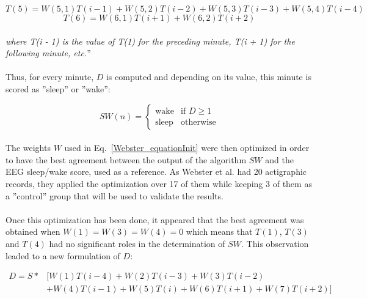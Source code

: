 \documentclass[a4paper,12pt]{article}
\begin{document}
\begin{equation}
T(5) = W(5, 1) T(i - 1) + W(5,2) T(i - 2) + W(5, 3) T(i - 3) + W(5, 4) T(i - 4)
\end{equation}
\begin{equation}
T(6) = W(6, 1) T(i + 1) + W(6, 2) T(i + 2)
\end{equation}

\paragraph{}
\textit{where T(i - 1) is the value of T(1) for the preceding minute, T(i + 1) for the following minute, etc.}''\cite{Webster1982}

\paragraph{}
Thus, for every minute, $D$ is computed and depending on its value, this minute is scored as ''sleep'' or ''wake'':

\begin{equation}
SW(n) = \left\{
    \begin{array}{ll}
        \mbox{wake} & \mbox{if } D \geq 1\\
        \mbox{sleep} & \mbox{otherwise}
    \end{array}
\right.
\end{equation}

\paragraph{}
The weights $W$ used in Eq.~\ref{Webster_equationInit} were then optimized in order to have the best agreement between the output of the algorithm $SW$ and the EEG sleep/wake score, used as a reference. As Webster et al. had 20 actigraphic records, they applied the optimization over 17 of them while keeping 3 of them as a ''control'' group that will be used to validate the results.

\paragraph{}
Once this optimization has been done, it appeared that the best agreement was obtained when $W(1) = W(3) = W(4) = 0$ which means that $T(1)$, $T(3)$ and $T(4)$ had no significant roles in the determination of $SW$.
This observation leaded to a new formulation of $D$:

\begin{equation}
\begin{split}
D = S * &[W(1) T(i-4) + W(2) T(i - 3) + W(3) T(i - 2)\\
         &+ W(4) T(i - 1) + W(5) T(i) + W(6) T(i+1) + W(7) T(i+2)]
\end{split}
\end{equation}
\end{document}
